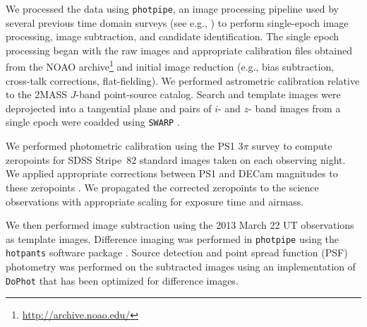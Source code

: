 We processed the data using {\tt photpipe}, an image processing pipeline used by several previous time domain surveys (see e.g., \citealt{rest+05,rest+14}) to perform single-epoch image processing, image subtraction, and candidate identification. The single epoch processing began with the raw images and appropriate calibration files obtained from the NOAO archive\footnote{\url{http://archive.noao.edu/}} and initial image reduction (e.g., bias subtraction, cross-talk corrections, flat-fielding). We performed astrometric calibration relative to the 2MASS $J$-band point-source catalog. Search and template images were deprojected into a tangential plane and pairs of $i$- and $z$- band images from a single epoch were coadded using {\tt SWARP} \citep{bertin+02}.  

We performed photometric calibration using the PS1 3$\pi$ survey to compute zeropoints for SDSS Stripe~82 standard images taken on each observing night. We applied appropriate corrections between PS1 and DECam magnitudes to these zeropoints \citep{scolnic+15}. We propagated the corrected zeropoints to the science observations with appropriate scaling for exposure time and airmass.

We then performed image subtraction using the 2013 March 22 UT observations as template images. Difference imaging was performed in {\tt photpipe} using the {\tt hotpants} software package \citep{alard00,becker15}. Source detection and point spread function (PSF) photometry was performed on the subtracted images using an implementation of {\tt DoPhot} \citep{schechter+93} that has been optimized for difference images. 

